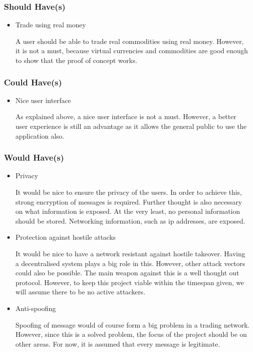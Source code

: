 \subsubsection{Should Have(s)}
\begin{itemize}
\item Trade using real money

A user should be able to trade real commodities using real money.
However, it is not a must, because virtual currencies and commodities are good enough to show that the proof of concept works.
\end{itemize}

\subsubsection{Could Have(s)}
\begin{itemize}
\item Nice user interface

As explained above, a nice user interface is not a must.
However, a better user experience is still an advantage as it allows the general public to use the application also.
\end{itemize}

\subsubsection{Would Have(s)}
\begin{itemize}
\item Privacy

It would be nice to ensure the privacy of the users.
In order to achieve this, strong encryption of messages is required.
Further thought is also necessary on what information is exposed.
At the very least, no personal information should be stored.
Networking information, such as ip addresses, are exposed.

\item Protection against hostile attacks

It would be nice to have a network resistant against hostile takeover.
Having a decentralised system plays a big role in this.
However, other attack vectors could also be possible.
The main weapon against this is a well thought out protocol.
However, to keep this project viable within the timespan given, we will assume there to be no active attackers.

\item Anti-spoofing

Spoofing of message would of course form a big problem in a trading network.
However, since this is a solved problem, the focus of the project should be on other areas.
For now, it is assumed that every message is legitimate.
\end{itemize}